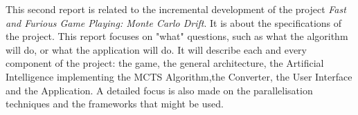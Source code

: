 This second report is related to the incremental development of the project \textit{Fast and Furious Game Playing: Monte Carlo Drift}. It is about the specifications of the project.
This report focuses on "what" questions, such as what the algorithm will do, or what the application will do. It will describe each and every component of the project: the game, the general architecture, the Artificial Intelligence implementing the MCTS Algorithm,the Converter, the User Interface and the Application. A detailed focus is also made on the parallelisation techniques and the frameworks that might be used.